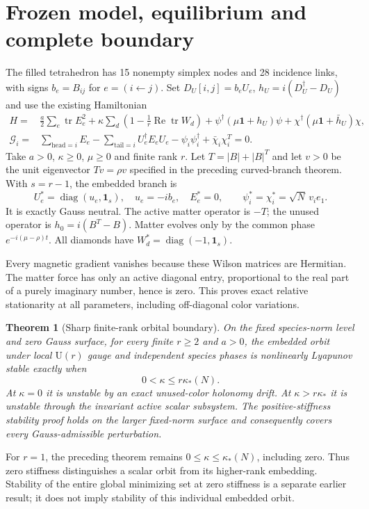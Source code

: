 \documentclass[11pt,a4paper]{article}
\newtheorem{theorem}{Theorem}\newtheorem{lemma}[theorem]{Lemma}\newtheorem{proposition}[theorem]{Proposition}
\newcommand{\id}{\mathbf1}\newcommand{\tr}{\operatorname{tr}}\newcommand{\diag}{\operatorname{diag}}\newcommand{\Rea}{\operatorname{Re}}
\begin{document}
\newpage
\section{Frozen model, equilibrium and complete boundary}
The filled tetrahedron has 15 nonempty simplex nodes and 28 incidence links, with signs $b_e=B_{ij}$ for $e=(i\leftarrow j)$. Set $D_U[i,j]=b_eU_e$, $h_U=i(D_U^\dagger-D_U)$ and use the existing Hamiltonian
\begin{align*}
H={}&\frac a2\sum_e\tr E_e^2+\kappa\sum_d\left(1-\frac1r\Rea\tr W_d\right)
+\psi^\dagger(\mu\id+h_U)\psi+\chi^\dagger(\mu\id+\bar h_U)\chi,\\
\mathcal G_i={}&\sum_{\mathrm{head}=i}E_e-\sum_{\mathrm{tail}=i}U_e^\dagger E_eU_e
-\psi_i\psi_i^\dagger+\bar\chi_i\chi_i^T=0.
\end{align*}
Take $a>0$, $\kappa\ge0$, $\mu\ge0$ and finite rank $r$. Let $T=|B|+|B|^T$ and let $v>0$ be the unit eigenvector $Tv=\rho v$ specified in the preceding curved-branch theorem. With $s=r-1$, the embedded branch is
\[
U_e^*=\diag(u_e,\id_s),\quad u_e=-ib_e,\quad E_e^*=0,
\qquad\psi_i^*=\chi_i^*=\sqrt N\,v_i e_1.
\]
It is exactly Gauss neutral. The active matter operator is $-T$; the unused operator is $h_0=i(B^T-B)$. Matter evolves only by the common phase $e^{-i(\mu-\rho)t}$. All diamonds have $W_d^*=\diag(-1,\id_s)$.

Every magnetic gradient vanishes because these Wilson matrices are Hermitian. The matter force has only an active diagonal entry, proportional to the real part of a purely imaginary number, hence is zero. This proves exact relative stationarity at all parameters, including off-diagonal color variations.

\begin{theorem}[Sharp finite-rank orbital boundary]\label{th:main}
On the fixed species-norm level and zero Gauss surface, for every finite $r\ge2$ and $a>0$, the embedded orbit under local $\mathrm U(r)$ gauge and independent species phases is nonlinearly Lyapunov stable exactly when
\[
\boxed{0<\kappa\le r\kappa_*(N).}
\]
At $\kappa=0$ it is unstable by an exact unused-color holonomy drift. At $\kappa>r\kappa_*$ it is unstable through the invariant active scalar subsystem. The positive-stiffness stability proof holds on the larger fixed-norm surface and consequently covers every Gauss-admissible perturbation.
\end{theorem}
For $r=1$, the preceding theorem remains $0\le\kappa\le\kappa_*(N)$, including zero. Thus zero stiffness distinguishes a scalar orbit from its higher-rank embedding. Stability of the entire global minimizing set at zero stiffness is a separate earlier result; it does not imply stability of this individual embedded orbit.
\end{document}
